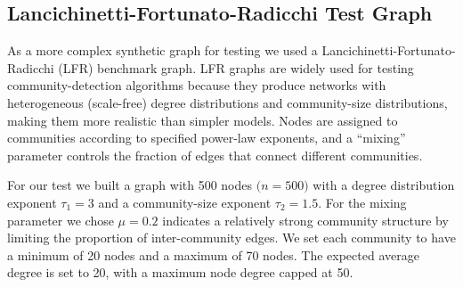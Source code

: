 \subsection{Lancichinetti-Fortunato-Radicchi Test Graph}
As a more complex synthetic graph for testing we used a Lancichinetti-Fortunato-Radicchi (LFR) benchmark graph. LFR graphs are widely used for testing community-detection algorithms because they produce networks with heterogeneous (scale-free) degree distributions and community-size distributions, making them more realistic than simpler models. Nodes are assigned to communities according to specified power-law exponents, and a “mixing” parameter controls the fraction of edges that connect different communities.

For our test we built a graph with 500 nodes $\bigl(n = 500\bigr)$ with a degree distribution exponent $\tau_{1} = 3$ and a community-size exponent $\tau_{2} = 1.5$. For the mixing parameter we chose $\mu = 0.2$ indicates a relatively strong community structure by limiting the proportion of inter-community edges. We set each community to have a minimum of 20 nodes and a maximum of 70 nodes. The expected average degree is set to 20, with a maximum node degree capped at 50. 

